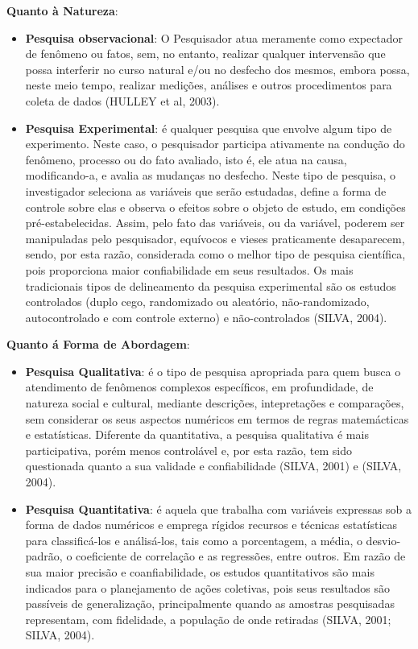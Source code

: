 \newpage
\textbf{Quanto à Natureza}: 

\begin{itemize}
\item \textbf{Pesquisa observacional}: O Pesquisador atua meramente como expectador de fenômeno ou fatos, sem, no entanto, realizar qualquer intervensão que possa interferir no curso natural e/ou no desfecho dos mesmos, embora possa, neste meio tempo, realizar medições, análises e outros procedimentos para coleta de dados (HULLEY et al, 2003).
\item \textbf{Pesquisa Experimental}: é qualquer pesquisa que envolve algum tipo de experimento. Neste caso, o pesquisador participa ativamente na condução do fenômeno, processo ou do fato avaliado, isto é, ele atua na causa, modificando-a, e avalia as mudanças no desfecho. Neste tipo de pesquisa, o investigador seleciona as variáveis que serão estudadas, define a forma de controle sobre elas e observa o efeitos sobre o objeto de estudo, em condições pré-estabelecidas. Assim, pelo fato das variáveis, ou da variável, poderem ser manipuladas pelo pesquisador, equívocos e vieses praticamente  desaparecem, sendo, por esta razão, considerada como o melhor tipo de pesquisa científica, pois proporciona maior confiabilidade em seus resultados. Os mais tradicionais tipos de delineamento da pesquisa experimental são os estudos controlados (duplo cego, randomizado ou aleatório, não-randomizado, autocontrolado e com controle externo) e não-controlados (SILVA, 2004). 
\end{itemize}


\textbf{Quanto á Forma de Abordagem}: 

\begin{itemize}
\item \textbf{Pesquisa Qualitativa}: é o tipo de pesquisa apropriada para quem busca o atendimento de fenômenos complexos específicos, em profundidade, de natureza social e cultural, mediante descrições, intepretações e comparações, sem considerar os seus aspectos numéricos em termos de regras matemácticas e estatísticas. Diferente da quantitativa, a pesquisa qualitativa é mais participativa, porém menos controlável e, por esta razão, tem sido questionada quanto a sua validade e confiabilidade (SILVA, 2001) e (SILVA, 2004).
\item \textbf{Pesquisa Quantitativa}: é aquela que trabalha com variáveis expressas sob a forma de dados numéricos e emprega rígidos recursos e técnicas estatísticas para classificá-los e análisá-los, tais como a porcentagem, a média, o desvio-padrão, o coeficiente de correlação e as regressões, entre outros. Em razão de sua maior precisão e coanfiabilidade, os estudos quantitativos são mais indicados para o planejamento de ações coletivas, pois seus resultados são passíveis de generalização, principalmente quando as amostras pesquisadas representam, com fidelidade, a população de onde retiradas (SILVA, 2001; SILVA, 2004).
\end{itemize}


